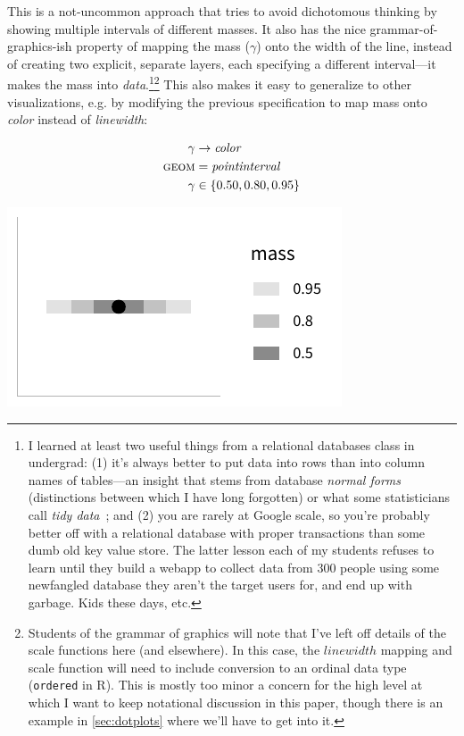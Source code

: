 \documentclass[journal]{vgtc}                     %
\begin{document}
This is a not-uncommon approach that tries to avoid dichotomous thinking by showing multiple intervals of different masses. It also has the nice grammar-of-graphics-ish property of mapping the mass ($\gamma$) onto the width of the line, instead of creating two explicit, separate layers, each specifying a different interval---it makes the mass into \textit{data}.\footnote{I learned at least two useful things from a relational databases class in undergrad: (1) it's always better to put data into rows than into column names of tables---an insight that stems from database \textit{normal forms}~\cite{codd1990relational} (distinctions between which I have long forgotten) or what some statisticians call \textit{tidy data}~\cite{hadley2014tidy}; and (2) you are rarely at Google scale, so you're probably better off with a relational database with proper transactions than some dumb old key value store. The latter lesson each of my students refuses to learn until they build a webapp to collect data from 300 people using some newfangled database they aren't the target users for, and end up with garbage. Kids these days, etc.}\footnote{Students of the grammar of graphics will note that I've left off details of the scale functions here (and elsewhere). In this case, the $linewidth$ mapping and scale function will need to include conversion to an ordinal data type (\texttt{ordered} in R). This is mostly too minor a concern for the high level at which I want to keep notational discussion in this paper, though there is an example in \cref{sec:dotplots} where we'll have to get into it.} This also makes it easy to generalize to other visualizations, e.g. by modifying the previous specification to map mass onto \textit{color} instead of \textit{linewidth}:


\noindent
\begin{minipage}{.5\columnwidth}

\begin{align*}
\gamma &\rightarrow \mathit{color}\\
\textsc{geom} &= \mathit{pointinterval}\\
\gamma &\in \{0.50, 0.80, 0.95\}
\end{align*}
\end{minipage}%
  \begin{minipage}{.4\columnwidth}
    \centering
    \includegraphics[width=1.2\columnwidth]{figs/3-stat_pointinterval_color.pdf}
  \end{minipage}
\hfill\break
\end{document}
